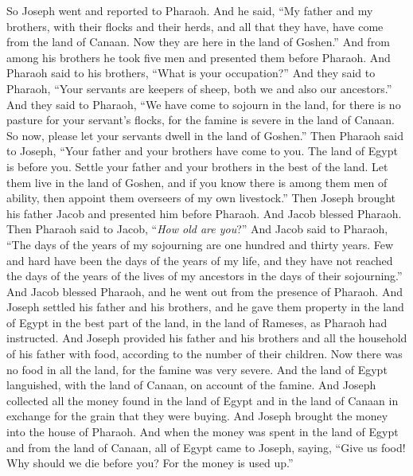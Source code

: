 \begin{biblechapter} %
 So Joseph went and reported to Pharaoh. And he said, “My father and my brothers, with their flocks and their herds, and all that they have, have come from the land of Canaan. Now they are here in the land of Goshen.”
\verse And from among his brothers he took five men and presented them before Pharaoh.
\verse And Pharaoh said to his brothers, “What is your occupation?” And they said to Pharaoh, “Your servants are keepers of sheep, both we and also our ancestors.”
\verse And they said to Pharaoh, “We have come to sojourn in the land, for there is no pasture for your servant’s flocks, for the famine is severe in the land of Canaan. So now, please let your servants dwell in the land of Goshen.”
\verse Then Pharaoh said to Joseph, “Your father and your brothers have come to you.
\verse The land of Egypt is before you. Settle your father and your brothers in the best of the land. Let them live in the land of Goshen, and if you know there is among them men of ability, then appoint them overseers of my own livestock.”
\verse Then Joseph brought his father Jacob and presented him before Pharaoh. And Jacob blessed Pharaoh.
\verse Then Pharaoh said to Jacob, “\textit{How old are you}?”
\verse And Jacob said to Pharaoh, “The days of the years of my sojourning are one hundred and thirty years. Few and hard have been the days of the years of my life, and they have not reached the days of the years of the lives of my ancestors in the days of their sojourning.”
\verse And Jacob blessed Pharaoh, and he went out from the presence of Pharaoh.
\verse And Joseph settled his father and his brothers, and he gave them property in the land of Egypt in the best part of the land, in the land of Rameses, as Pharaoh had instructed.
\verse And Joseph provided his father and his brothers and all the household of his father with food, according to the number of their children.
 Now there was no food in all the land, for the famine was very severe. And the land of Egypt languished, with the land of Canaan, on account of the famine.
\verse And Joseph collected all the money found in the land of Egypt and in the land of Canaan in exchange for the grain that they were buying. And Joseph brought the money into the house of Pharaoh.
\verse And when the money was spent in the land of Egypt and from the land of Canaan, all of Egypt came to Joseph, saying, “Give us food! Why should we die before you? For the money is used up.”

\end{biblechapter}
